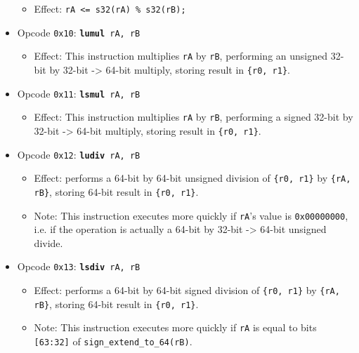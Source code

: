 \documentclass{article}
\begin{document}
\begin{itemize}
\begin{itemize}
		\item Effect: \texttt{rA <= s32(rA) \% s32(rB);}
		\end{itemize}
	\item Opcode \texttt{0x10}:
		\texttt{\textbf{lumul} rA, rB}
		\begin{itemize}
		\item Effect: This instruction multiplies \texttt{rA} by
		\texttt{rB}, performing an unsigned 32-bit by 32-bit -> 64-bit
		multiply, storing result in \texttt{\{r0, r1\}}.
		\end{itemize}
	\item Opcode \texttt{0x11}:
		\texttt{\textbf{lsmul} rA, rB}
		\begin{itemize}
		\item Effect: This instruction multiplies \texttt{rA} by
		\texttt{rB}, performing a signed 32-bit by 32-bit -> 64-bit
		multiply, storing result in \texttt{\{r0, r1\}}.
		\end{itemize}
	\item Opcode \texttt{0x12}:
		\texttt{\textbf{ludiv} rA, rB}
		\begin{itemize}
		\item Effect: performs a 64-bit by 64-bit unsigned division of
		\texttt{\{r0, r1\}} by \texttt{\{rA, rB\}}, storing 64-bit
		result in \texttt{\{r0, r1\}}.
		\item Note: This instruction executes more quickly if
		\texttt{rA}'s value is \texttt{0x00000000}, i.e. if the
		operation is actually a 64-bit by 32-bit -> 64-bit unsigned
		divide.
		\end{itemize}
	\item Opcode \texttt{0x13}:
		\texttt{\textbf{lsdiv} rA, rB}
		\begin{itemize}
		\item Effect: performs a 64-bit by 64-bit signed division of
		\texttt{\{r0, r1\}} by \texttt{\{rA, rB\}}, storing 64-bit
		result in \texttt{\{r0, r1\}}.
		\item Note: This instruction executes more quickly if
		\texttt{rA} is equal to bits \texttt{[63:32]} of
		\texttt{sign\_extend\_to\_64(rB)}.
		\end{itemize}

\end{itemize}
\end{document}
